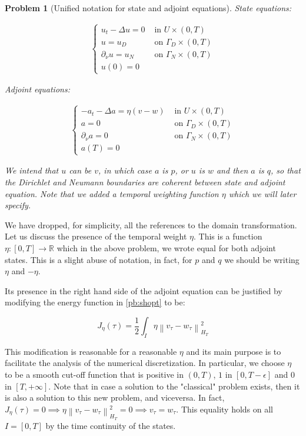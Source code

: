 \documentclass[english,a4paper,10pt,oneside]{scrbook}	%
\theoremstyle{break}
\newtheorem{pb}[equation]{Problem}
\theoremstyle{remark}
\newcommand{\mR}{\mathbb{R}}
\newcommand{\norm}[1]{\left\lVert#1\right\rVert}
\begin{document}
\begin{pb}[Unified notation for state and adjoint equations]
\label{pb:uni_state_adj}
State equations:

\begin{align*}
\left\{\begin{matrix}
u_t-\Delta u =0 & \text{ in } U\times (0,T)\\ 
u = u_D & \text{ on } \Gamma_D\times(0,T)\\ 
\partial_\nu u = u_N & \text{ on } \Gamma_N\times(0,T)\\ 
u(0) =0 & 
\end{matrix}\right.
\end{align*}

Adjoint equations:

\begin{align*}
\left\{\begin{matrix}
-a_t-\Delta a =\eta (v-w) & \text{ in } U\times (0,T)\\ 
a = 0 & \text{ on } \Gamma_D\times(0,T)\\ 
\partial_\nu a = 0 & \text{ on } \Gamma_N\times(0,T)\\ 
a(T) =0 & 
\end{matrix}\right.
\end{align*}

We intend that $u$ can be $v$, in which case $a$ is $p$, or $u$ is $w$ and then $a$ is $q$, so that the Dirichlet and Neumann boundaries are coherent between state and adjoint equation. Note that we added a temporal weighting function $\eta$ which we will later specify.

\end{pb}

We have dropped, for simplicity, all the references to the domain transformation. Let us discuss the presence of the temporal weight $\eta$. This is a function $\eta: [0,T] \rightarrow \mR$ which in the above problem, we wrote equal for both adjoint states. This is a slight abuse of notation, in fact, for $p$ and $q$ we should be writing $\eta$ and $-\eta$.

Its presence in the right hand side of the adjoint equation can be justified by modifying the energy function in \cref{pb:shopt} to be:

$$J_\eta(\tau) = \frac{1}{2} \int_I \eta \norm{v_\tau - w_\tau}_{H_T}^2$$

This modification is reasonable for a reasonable $\eta$ and its main purpose is to facilitate the analysis of the numerical discretization. In particular, we choose $\eta$ to be a smooth cut-off function that is positive in $(0,T)$, $1$ in $[0, T-\epsilon]$ and $0$ in $[T, +\infty]$. Note that in case a solution to the "classical" problem exists, then it is also a solution to this new problem, and viceversa. In fact, $J_\eta(\tau)=0 \implies \eta \norm{v_\tau - w_\tau}_{H_T}^2=0 \implies v_\tau = w_\tau$. This equality holds on all $I=[0,T]$ by the time continuity of the states.
\end{document}
